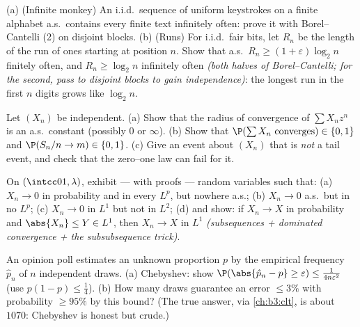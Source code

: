 \begin{exercise}[$\star\star$]\label{exo:b3:probability:4}
(a) (Infinite monkey) An i.i.d.\ sequence of uniform
keystrokes on a finite alphabet a.s.\ contains every finite
text infinitely often: prove it with Borel--Cantelli (2) on
disjoint blocks.
(b) (Runs) For i.i.d.\ fair bits, let $R_n$ be the length of
the run of ones starting at position $n$. Show that a.s.\
$R_n \geq (1+\varepsilon)\log_2n$ finitely often, and $R_n
\geq \log_2 n$ infinitely often \emph{(both halves of
Borel--Cantelli; for the second, pass to disjoint blocks to
gain independence)}: the longest run in the first $n$ digits
grows like $\log_2n$.
\end{exercise}

\begin{exercise}[$\star\star$]\label{exo:b3:probability:5}
Let $(X_n)$ be independent.
(a) Show that the radius of convergence of $\sum X_n z^n$ is
an a.s.\ constant (possibly $0$ or $\infty$).
(b) Show that $\P(\sum X_n \text{ converges}) \in \{0, 1\}$
and $\P(S_n/n \to m) \in \{0,1\}$.
(c) Give an event about $(X_n)$ that is \emph{not} a tail
event, and check that the zero--one law can fail for it.
\end{exercise}

\begin{exercise}[$\star\star$]\label{exo:b3:probability:6}
On $(\intcc01, \lambda)$, exhibit --- with proofs --- random
variables such that:
(a) $X_n \to 0$ in probability and in every $L^p$, but
nowhere a.s.;
(b) $X_n \to 0$ a.s.\ but in no $L^p$;
(c) $X_n \to 0$ in $L^1$ but not in $L^2$;
(d) and show: if $X_n \to X$ in probability and $\abs{X_n}
\leq Y \in L^1$, then $X_n \to X$ in $L^1$
\emph{(subsequences + dominated convergence +
the subsubsequence trick)}.
\end{exercise}

\begin{exercise}[$\star\star$]\label{exo:b3:probability:7}
An opinion poll estimates an unknown proportion $p$ by the
empirical frequency $\hat p_n$ of $n$ independent draws.
(a) Chebyshev: show $\P(\abs{\hat p_n - p} \geq \varepsilon)
\leq \frac1{4n\varepsilon^2}$ (use $p(1-p) \leq \frac14$).
(b) How many draws guarantee an error $\leq 3\%$ with
probability $\geq 95\%$ by this bound? (The true answer,
via \cref{ch:b3:clt}, is about $1070$: Chebyshev is honest
but crude.)
\end{exercise}

